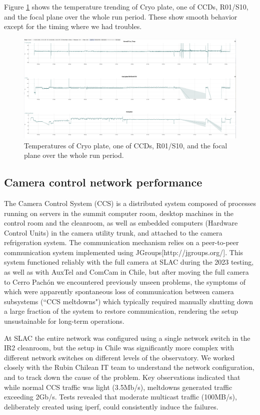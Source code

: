 Figure \ref{fig:tempsoverthewholeperiod} shows the temperature trending of Cryo plate, one of CCDs, R01/S10, and the focal plane over the whole run period. These show smooth behavior except for the timing where we had troubles.
\begin{figure}
    \centering
    \includegraphics[width=1.0\linewidth]{figures/Issues/LSSTCam_Temps_Run7.png}
    \caption{Temperatures of Cryo plate, one of CCDs, R01/S10, and the focal plane over the whole run period.}
    \label{fig:tempsoverthewholeperiod}
\end{figure}

\clearpage
\subsection{Camera control network performance}\label{sec:ccsmeltdown}

The Camera Control System (CCS) is a distributed system composed of processes running on servers in the summit computer room, desktop machines in the control room and the cleanroom, as well as embedded computers (Hardware Control Units) in the camera utility trunk, and attached to the camera refrigeration system. The communication mechanism relies on a peer-to-peer communication system implemented using JGroups[http://jgroups.org/]. This system functioned reliably with the full camera at SLAC during the 2023 testing, as well as with AuxTel and ComCam in Chile, but after moving the full camera to Cerro Pachón we encountered previously unseen problems, the symptoms of which were apparently spontaneous loss of communication between camera subsystems (``CCS meltdowns") which typically required manually shutting down a large fraction of the system to restore communication, rendering the setup unsustainable for long-term operations.

At SLAC the entire network was configured using a single network switch in the IR2 cleanroom, but the setup in Chile was significantly more complex with different network switches on different levels of the observatory. We worked closely with the Rubin Chilean IT team to understand the network configuration, and to track down the cause of the problem. Key observations indicated that while normal CCS traffic was light (3.5Mb/s), meltdowns generated traffic exceeding 2Gb/s. Tests revealed that moderate multicast traffic (100MB/s), deliberately created using iperf, could consistently induce the failures. 

